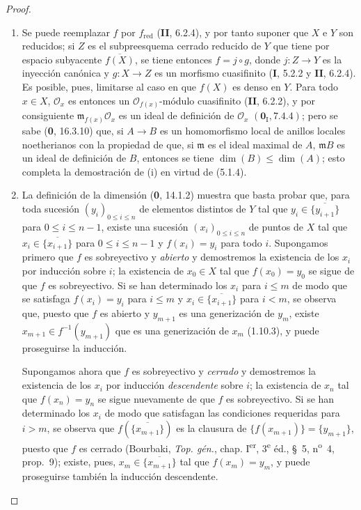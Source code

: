 \begin{proof}
\begin{enumerate}
\item[(i)] Se puede reemplazar $f$ por $f_{\mathrm{red}}$ (\textbf{II}, 6.2.4), y por
tanto suponer que $X$ e $Y$ son reducidos; si $Z$ es el subpreesquema cerrado
reducido de $Y$ que tiene por espacio subyacente $\overline{f(X)}$, se tiene
entonces $f=j\circ g$, donde $j:Z\to Y$ es la inyección canónica y
$g:X\to Z$ es un morfismo cuasifinito (\textbf I, 5.2.2 y \textbf{II}, 6.2.4). Es posible, pues,
limitarse al caso en que $f(X)$ es denso en $Y$. Para todo $x\in X$,
$\mathcal O_x$ es entonces un $\mathcal O_{f(x)}$-módulo cuasifinito
(\textbf{II}, 6.2.2), y por consiguiente $\mathfrak m_{f(x)}\mathcal O_x$ es un ideal
de definición de $\mathcal O_x$ $(\mathbf{0}_{\mathrm I},7.4.4)$; pero se sabe
(\textbf 0, 16.3.10) que, si $A\to B$ es un homomorfismo local de anillos locales
noetherianos con la propiedad de que, si $\mathfrak m$ es el ideal maximal de
$A$, $\mathfrak mB$ es un ideal de definición de $B$, entonces se tiene
$\dim(B)\leq\dim(A)$; esto completa la demostración de (i) en virtud de
(5.1.4).

\item[(ii)] La definición de la dimensión (\textbf 0, 14.1.2) muestra que basta probar
que, para toda sucesión $(y_i)_{0\leq i\leq n}$ de elementos distintos de $Y$
tal que $y_i\in\overline{\{y_{i+1}\}}$ para $0\leq i\leq n-1$, existe una
sucesión $(x_i)_{0\leq i\leq n}$ de puntos de $X$ tal que
$x_i\in\overline{\{x_{i+1}\}}$ para $0\leq i\leq n-1$ y $f(x_i)=y_i$ para
todo $i$. Supongamos primero que $f$ es sobreyectivo y \emph{abierto} y demostremos
la existencia de los $x_i$ por inducción sobre $i$; la existencia de
$x_0\in X$ tal que $f(x_0)=y_0$ se sigue de que $f$ es sobreyectivo. Si se han
determinado los $x_i$ para $i\leq m$ de modo que se satisfaga $f(x_i)=y_i$
para $i\leq m$ y $x_i\in\overline{\{x_{i+1}\}}$ para $i<m$, se observa que,
puesto que $f$ es abierto y $y_{m+1}$ es una generización de $y_m$, existe
$x_{m+1}\in f^{-1}(y_{m+1})$ que es una generización de $x_m$ (1.10.3), y
puede proseguirse la inducción.

Supongamos ahora que $f$ es sobreyectivo y \emph{cerrado} y demostremos la existencia
de los $x_i$ por inducción \emph{descendente} sobre $i$; la existencia de $x_n$ tal
que $f(x_n)=y_n$ se sigue nuevamente de que $f$ es sobreyectivo. Si se han
determinado los $x_i$ de modo que satisfagan las condiciones requeridas para
$i>m$, se observa que $f(\overline{\{x_{m+1}\}})$ es la clausura de
$\{f(x_{m+1})\}=\{y_{m+1}\}$, puesto que $f$
es cerrado (Bourbaki,
\emph{Top. gén.}, chap. I\textsuperscript{er}, 3\textsuperscript{e} éd.,
\S~5, n\textsuperscript{o}~4, prop.~9); existe, pues,
$x_m\in\overline{\{x_{m+1}\}}$ tal que $f(x_m)=y_m$, y puede proseguirse
también la inducción descendente.
\end{enumerate}
\end{proof}

